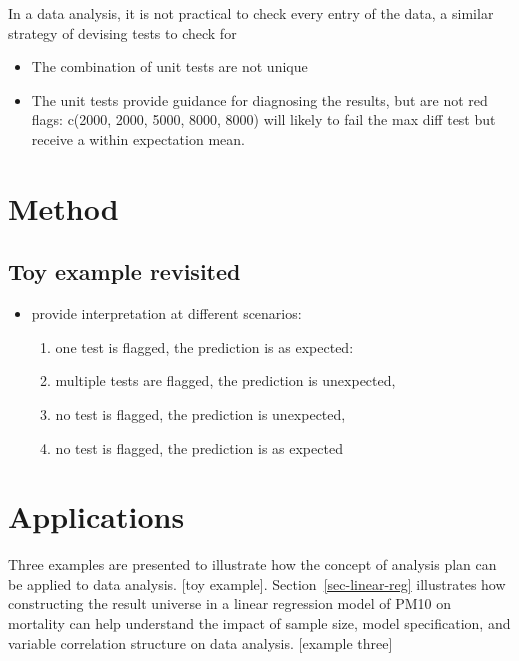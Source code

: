 \documentclass[
]{jds}
\providecommand{\tightlist}{%
  \setlength{\itemsep}{0pt}\setlength{\parskip}{0pt}}\usepackage{longtable,booktabs,array}
\begin{document}
In a data analysis, it is not practical to check every entry of the
data, a similar strategy of devising tests to check for

\begin{itemize}
\tightlist
\item
  The combination of unit tests are not unique
\item
  The unit tests provide guidance for diagnosing the results, but are
  not red flags: c(2000, 2000, 5000, 8000, 8000) will likely to fail the
  max diff test but receive a within expectation mean.
\end{itemize}

\section{Method}\label{method}

\subsection{Toy example revisited}\label{toy-example-revisited}

\begin{itemize}
\item
  provide interpretation at different scenarios:

  \begin{enumerate}
  \def\labelenumi{\arabic{enumi})}
  \tightlist
  \item
    one test is flagged, the prediction is as expected:
  \item
    multiple tests are flagged, the prediction is unexpected,
  \item
    no test is flagged, the prediction is unexpected,
  \item
    no test is flagged, the prediction is as expected
  \end{enumerate}
\end{itemize}

\section{Applications}\label{sec-examples}

Three examples are presented to illustrate how the concept of analysis
plan can be applied to data analysis. {[}toy example{]}.
Section~\ref{sec-linear-reg} illustrates how constructing the result
universe in a linear regression model of PM10 on mortality can help
understand the impact of sample size, model specification, and variable
correlation structure on data analysis. {[}example three{]}
\end{document}
